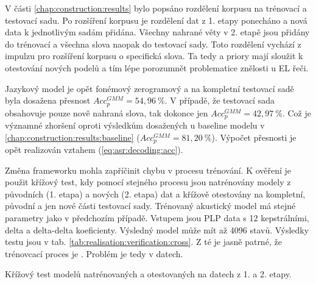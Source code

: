 V části \ref{chap:construction:results} bylo popsáno rozdělení korpusu na trénovací a testovací sadu. Po rozšíření korpusu je rozdělení dat z 1. etapy ponecháno a nová data k jednotlivým sadám přidána. Všechny nahrané věty v 2. etapě jsou přidány do trénovací a všechna slova naopak do testovací sady. Toto rozdělení vychází z impulzu pro rozšíření korpusu o specifická slova. Ta tedy a priory mají sloužit k otestování nových podelů a tím lépe porozumnět problematice znělosti u EL řeči.


Jazykový model je opět fonémový zerogramový a na kompletní testovací sadě byla dosažena přesnost $Acc_{p}^{GMM} = 54,96\ \%$. V případě, že testovací sada obsahovuje pouze nově nahraná slova, tak dokonce jen $Acc_{p}^{GMM} = 42,97\ \%$. Což je významné zhoršení oproti výsledkům dosažených u baseline modelu v \ref{chap:construction:results:baseline} ($Acc_{p}^{GMM} = 81,20\ \%$). Výpočet přesnosti je opět realizován vztahem (\ref{eq:asr:decoding:acc}).

Změna frameworku mohla zapříčinit chybu v procesu trénování. K ověření je použit křížový test, kdy pomocí stejného procesu jsou natrénovány modely z původních (1. etapa) a nových (2. etapa) dat a křížově otestovány na kompletní, původní a jen nové části testovací sady. Trénovaný akustický model má stejné parametry jako v předchozím případě. Vstupem jsou PLP data s 12 kepstrálními, delta a delta-delta koeficienty. Výsledný model může mít až 4096 stavů. Výsledky testu jsou v tab. \ref{tab:realisation:verification:cross}. Z té je jasně patrné, že trénovcací proces je . Problém je tedy v datech.


\begin{table}[htpb]
  \centering
  \def\arraystretch{1.5}
  \caption{Křížový test modelů natrénovaných a otestovaných na datech z 1. a 2. etapy.}
  \label{tab:realisation:verification:cross}
\end{table}


